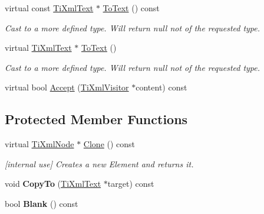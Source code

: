 \begin{DoxyCompactItemize}
\item 
virtual const \hyperlink{classTiXmlText}{Ti\+Xml\+Text} $\ast$ \hyperlink{classTiXmlText_a895bf34ffad17f7439ab2a52b9651648}{To\+Text} () const \hypertarget{classTiXmlText_a895bf34ffad17f7439ab2a52b9651648}{}\label{classTiXmlText_a895bf34ffad17f7439ab2a52b9651648}

\begin{DoxyCompactList}\small\item\em Cast to a more defined type. Will return null not of the requested type. \end{DoxyCompactList}\item 
virtual \hyperlink{classTiXmlText}{Ti\+Xml\+Text} $\ast$ \hyperlink{classTiXmlText_ae7c3a8fd3e4dbf6c0c4363a943d72f5b}{To\+Text} ()\hypertarget{classTiXmlText_ae7c3a8fd3e4dbf6c0c4363a943d72f5b}{}\label{classTiXmlText_ae7c3a8fd3e4dbf6c0c4363a943d72f5b}

\begin{DoxyCompactList}\small\item\em Cast to a more defined type. Will return null not of the requested type. \end{DoxyCompactList}\item 
virtual bool \hyperlink{classTiXmlText_a43b9954ebf679557fac1a4453f337b7c}{Accept} (\hyperlink{classTiXmlVisitor}{Ti\+Xml\+Visitor} $\ast$content) const 
\end{DoxyCompactItemize}
\subsection*{Protected Member Functions}
\begin{DoxyCompactItemize}
\item 
virtual \hyperlink{classTiXmlNode}{Ti\+Xml\+Node} $\ast$ \hyperlink{classTiXmlText_adde1869dfb029be50713fbfd8ce4d21f}{Clone} () const \hypertarget{classTiXmlText_adde1869dfb029be50713fbfd8ce4d21f}{}\label{classTiXmlText_adde1869dfb029be50713fbfd8ce4d21f}

\begin{DoxyCompactList}\small\item\em \mbox{[}internal use\mbox{]} Creates a new Element and returns it. \end{DoxyCompactList}\item 
void {\bfseries Copy\+To} (\hyperlink{classTiXmlText}{Ti\+Xml\+Text} $\ast$target) const \hypertarget{classTiXmlText_adcec7d9b6fccfc5777452bb97e6031c1}{}\label{classTiXmlText_adcec7d9b6fccfc5777452bb97e6031c1}

\item 
bool {\bfseries Blank} () const \hypertarget{classTiXmlText_a1c120428e3b3cf24d79706e6d2b65aa6}{}\label{classTiXmlText_a1c120428e3b3cf24d79706e6d2b65aa6}

\end{DoxyCompactItemize}
